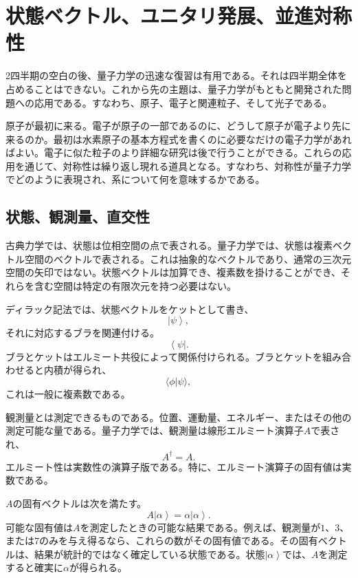 \chapter{状態ベクトル、ユニタリ発展、並進対称性}
\providecommand{\ket}[1]{\left\lvert#1\right\rangle}
\providecommand{\bra}[1]{\left\langle#1\right\rvert}

2四半期の空白の後、量子力学の迅速な復習は有用である。それは四半期全体を占めることはできない。これから先の主題は、量子力学がもともと開発された問題への応用である。すなわち、原子、電子と関連粒子、そして光子である。

原子が最初に来る。電子が原子の一部であるのに、どうして原子が電子より先に来るのか。最初は水素原子の基本方程式を書くのに必要なだけの電子力学があればよい。電子に似た粒子のより詳細な研究は後で行うことができる。これらの応用を通じて、対称性は繰り返し現れる道具となる。すなわち、対称性が量子力学でどのように表現され、系について何を意味するかである。

\section{状態、観測量、直交性}

古典力学では、状態は位相空間の点で表される。量子力学では、状態は複素ベクトル空間のベクトルで表される。これは抽象的なベクトルであり、通常の三次元空間の矢印ではない。状態ベクトルは加算でき、複素数を掛けることができ、それらを含む空間は特定の有限次元を持つ必要はない。

ディラック記法では、状態ベクトルをケットとして書き、
\begin{equation}
\ket{\psi},
\end{equation}
それに対応するブラを関連付ける。
\begin{equation}
\bra{\psi}.
\end{equation}
ブラとケットはエルミート共役によって関係付けられる。ブラとケットを組み合わせると内積が得られ、
\begin{equation}
\langle\phi|\psi\rangle,
\end{equation}
これは一般に複素数である。

観測量とは測定できるものである。位置、運動量、エネルギー、またはその他の測定可能な量である。量子力学では、観測量は線形エルミート演算子\(A\)で表され、
\begin{equation}
A^\dagger=A.
\end{equation}
エルミート性は実数性の演算子版である。特に、エルミート演算子の固有値は実数である。

\(A\)の固有ベクトルは次を満たす。
\begin{equation}
A\ket{\alpha}=\alpha\ket{\alpha}.
\end{equation}
可能な固有値は\(A\)を測定したときの可能な結果である。例えば、観測量が\(1\)、\(3\)、または\(7\)のみを与え得るなら、これらの数がその固有値である。その固有ベクトルは、結果が統計的ではなく確定している状態である。状態\(\ket{\alpha}\)では、\(A\)を測定すると確実に\(\alpha\)が得られる。

